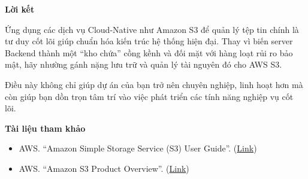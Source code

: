 \vspace{0.5em}\noindent\textbf{Lời kết}

Ứng dụng các dịch vụ Cloud-Native như Amazon S3 để quản lý tệp tin chính
là tư duy cốt lõi giúp chuẩn hóa kiến trúc hệ thống hiện đại. Thay vì
biến server Backend thành một ``kho chứa'' cồng kềnh và đối mặt với hàng
loạt rủi ro bảo mật, hãy nhường gánh nặng lưu trữ và quản lý tài nguyên
đó cho AWS S3.

Điều này không chỉ giúp dự án của bạn trở nên chuyên nghiệp, linh hoạt
hơn mà còn giúp bạn dồn trọn tâm trí vào việc phát triển các tính năng
nghiệp vụ cốt lõi.

\vspace{0.5em}\noindent\textbf{Tài liệu tham khảo}

\begin{itemize}
\tightlist
\item
  AWS. ``Amazon Simple Storage Service (S3) User Guide''.
  (\href{https://docs.aws.amazon.com/AmazonS3/latest/userguide/}{Link})
\item
  AWS. ``Amazon S3 Product Overview''.
  (\href{https://aws.amazon.com/s3/}{Link})
\end{itemize}

